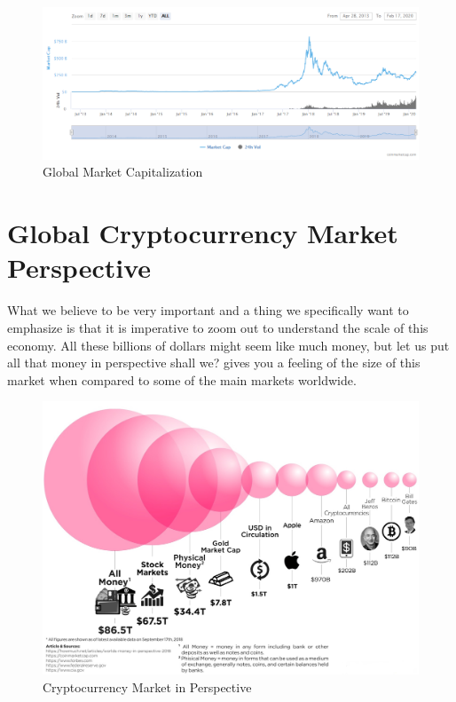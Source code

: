     \begin{figure}[htb]
        \centering
        \includegraphics[width=\textwidth]{img/ch-iceage/cmc_mcapchart_feb2020.PNG}
        \caption{Global Market Capitalization}
        \label{fig:totalmarketcap}
    \end{figure} 

\section{Global Cryptocurrency Market Perspective}

What we believe to be very important and a thing we specifically want to emphasize is that it is imperative to zoom out to understand the scale of this economy. All these billions of dollars might seem like much money, but let us put all that money in perspective shall we?  gives you a feeling of the size of this market when compared to some of the main markets worldwide.

\begin{figure}[htb]
    \centering
    \includegraphics[width=\textwidth]{img/ch-iceage/bitcoin-money-economy-in-perspective-2018.jpg}
    \caption{Cryptocurrency Market in Perspective}
    \label{fig:Cryptocurrency market perspective}
\end{figure}

